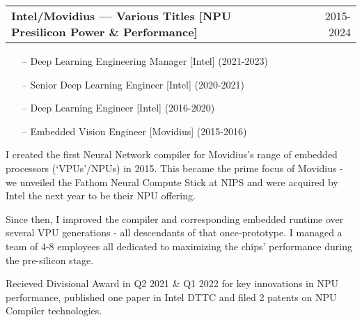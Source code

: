 \documentclass[a4paper,12pt]{article}
\makeatletter
\newenvironment{jobshort}[2]
    {
    \begin{tabularx}{\linewidth}{@{}l X r@{}}
    \textbf{#1} & \hfill &  #2 \\[3.75pt]
    \end{tabularx}
    }
    {
    }
\makeatother
\begin{document}
\begin{jobshort}{Intel/Movidius --- Various Titles [NPU Presilicon Power \& Performance]}{2015-2024}

\vspace{-15pt}
\begin{itemize}[noitemsep,topsep=0pt,parsep=0pt,partopsep=0pt]
    \item[--] Deep Learning Engineering Manager [Intel] (2021-2023)
    \item[--] Senior Deep Learning Engineer [Intel] (2020-2021)
    \item[--] Deep Learning Engineer [Intel] (2016-2020)
    \item[--] Embedded Vision Engineer [Movidius] (2015-2016)
\end{itemize}

I created the first Neural Network compiler for Movidius's range of embedded processors (‘VPUs’/NPUs) in 2015. This became the prime focus of Movidius - we unveiled the Fathom Neural Compute Stick at NIPS and were acquired by Intel the next year to be their NPU offering.

Since then, I improved the compiler and corresponding embedded runtime over several VPU generations - all descendants of that once-prototype. I managed a team of 4-8 employees all dedicated to maximizing the chips' performance during the pre-silicon stage.

Recieved Divisional Award in Q2 2021 \& Q1 2022 for key innovations in NPU performance, published one paper in Intel DTTC and filed 2 patents on NPU Compiler technologies.


\end{jobshort}
\end{document}
